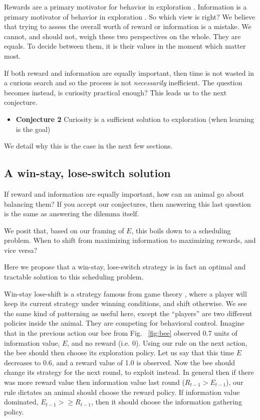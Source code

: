 Rewards are a primary motivator for behavior in exploration \citep{Sutton2018}. Information is a primary motivator of behavior in exploration  \citep{Inglis2001}. So which view is right? We believe that trying to assess the overall worth of reward or information is a mistake. We cannot, and should not, weigh these two perspectives on the whole. They are equals. To decide between them, it is their values in the moment which matter most.

If both reward and information are equally important, then time is not wasted in a curious search and so the process is not \textit{necessarily} inefficient. The question becomes instead, is curiosity practical enough? This leads us to the next conjecture. 

\begin{itemize}
	\item \textbf{Conjecture 2} Curiosity is a sufficient solution to exploration (when learning is the goal)
\end{itemize}

We detail why this is the case in the next few sections.

\subsection{A win-stay, lose-switch solution}
If reward and information are equally important, how can an animal go about balancing them? If you accept our conjectures, then answering this last question is the same as answering the dilemma itself. 

We posit that, based on our framing of $E$, this boils down to a scheduling problem. When to shift from maximizing information to maximizing rewards, and vice versa? 

Here we propose that a win-stay, lose-switch strategy is in fact an optimal and tractable solution to this scheduling problem.

Win-stay lose-shift is a strategy famous from game theory \citep{Nowak1993}, where a player will keep its current strategy under winning conditions, and shift otherwise. We see the same kind of patterning as useful here, except the ``players'' are two different policies inside the animal. They are competing for behavioral control. Imagine that in the previous action our bee from Fig. ~\ref{fig:bee} observed 0.7 units of information value, $E$, and no reward (i.e. 0). Using our rule on the next action, the bee should then choose its exploration policy. Let us say that this time $E$ decreases to 0.6, and a reward value of 1.0 is observed. Now the bee should change its strategy for the next round, to exploit instead. In general then if there was more reward value then information value last round ($R_{t-1} > E_{t-1}$), our rule dictates an animal should choose the reward policy. If information value dominated, $E_{t-1} >\ge R_{t-1}$, then it should choose the information gathering policy.

